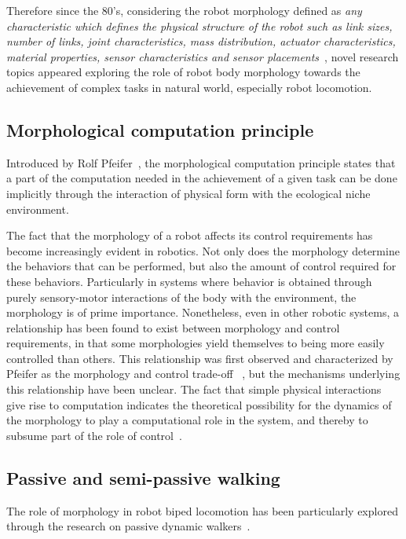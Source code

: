 Therefore since the 80's, considering the robot morphology defined as \emph{any characteristic which defines the physical structure of the robot such as link sizes, number of links, joint characteristics, mass distribution, actuator characteristics, material properties, sensor characteristics and sensor placements}~\cite{paul2006morphological}, novel research topics appeared exploring the role of robot body morphology towards the achievement of complex tasks in natural world, especially robot locomotion.


\subsection{Morphological computation principle} %

Introduced by Rolf Pfeifer~\cite{pfeifer2005morphological}, the morphological computation principle states that a part of the computation needed in the achievement of a given task can be done implicitly through the interaction of physical form with the ecological niche environment.

\textcolor{TODO}{The fact that the morphology of a robot affects its control requirements has become increasingly evident in robotics. Not only does the morphology determine the behaviors that can be performed, but also the amount of control required for these behaviors. Particularly in systems where behavior is obtained through purely sensory-motor interactions of the body with the environment, the morphology is of prime importance. Nonetheless, even in other robotic systems, a relationship has been found to exist between morphology and control requirements, in that some morphologies yield themselves to being more easily controlled than others.
This relationship was first observed and characterized by Pfeifer as the morphology and control trade-off ~\cite{pfeifer2001understanding}, but the mechanisms underlying this relationship have been unclear. The fact that simple physical interactions give rise to computation indicates the theoretical possibility for the dynamics of the morphology to play a computational role in the system, and thereby to subsume part of the role of control~\cite{paulinvestigation}.}


\subsection{Passive and semi-passive walking} %

The role of morphology in robot biped locomotion has been particularly explored through the research on passive dynamic walkers~\cite{wisse2007passive}.

